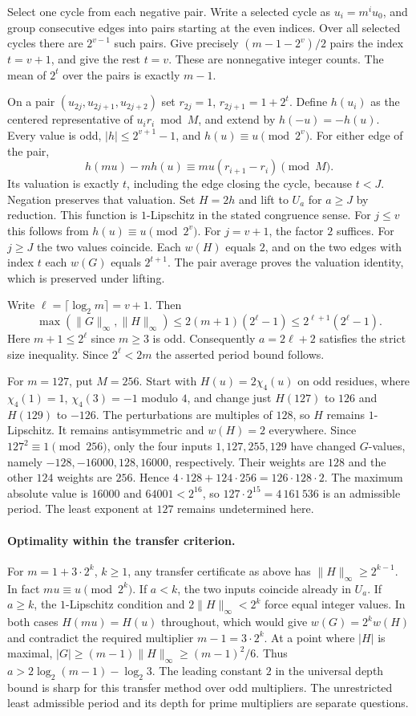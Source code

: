 \documentclass[11pt]{article}
\begin{document}
Select one cycle from each negative pair. Write a selected cycle
as $u_i=m^iu_0$, and group consecutive edges into pairs starting
at the even indices. Over all selected cycles there are $2^{v-1}$
such pairs. Give precisely $(m-1-2^v)/2$ pairs the index $t=v+1$,
and give the rest $t=v$. These are nonnegative integer counts.
The mean of $2^t$ over the pairs is exactly $m-1$.

On a pair $(u_{2j},u_{2j+1},u_{2j+2})$ set
$r_{2j}=1$, $r_{2j+1}=1+2^t$. Define $h(u_i)$ as the centered
representative of $u_i r_i\bmod M$, and extend by $h(-u)=-h(u)$.
Every value is odd, $|h|\le2^{v+1}-1$, and $h(u)\equiv u\pmod{2^v}$.
For either edge of the pair,
\[
 h(mu)-m h(u)\equiv mu(r_{i+1}-r_i)\pmod M.
\]
Its valuation is exactly $t$, including the edge closing the cycle,
because $t<J$. Negation preserves that valuation.
Set $H=2h$ and lift to $U_a$ for $a\ge J$ by reduction. This function is
$1$-Lipschitz in the stated congruence sense. For $j\le v$ this follows
from $h(u)\equiv u\pmod{2^v}$. For $j=v+1$, the factor $2$ suffices.
For $j\ge J$ the two values coincide. Each $w(H)$ equals $2$, and on
the two edges with index $t$ each $w(G)$ equals $2^{t+1}$. The pair
average proves the valuation identity, which is preserved under lifting.

Write $\ell=\lceil\log_2 m\rceil=v+1$. Then
\[
 \max(\|G\|_\infty,\|H\|_\infty)
 \le 2(m+1)(2^\ell-1)
 \le 2^{\ell+1}(2^\ell-1).
\]
Here $m+1\le2^\ell$ since $m\ge3$ is odd.
Consequently $a=2\ell+2$ satisfies the strict size inequality.
Since $2^\ell<2m$ the asserted period bound follows.

For $m=127$, put $M=256$. Start with
$H(u)=2\chi_4(u)$ on odd residues, where $\chi_4(1)=1$,
$\chi_4(3)=-1$ modulo $4$, and change just $H(127)$ to $126$ and
$H(129)$ to $-126$. The perturbations are multiples of $128$, so
$H$ remains $1$-Lipschitz. It remains antisymmetric and $w(H)=2$
everywhere. Since $127^2\equiv1\pmod{256}$, only the four inputs
$1,127,255,129$ have changed $G$-values, namely
$-128,-16000,128,16000$, respectively. Their weights are $128$ and
the other $124$ weights are $256$. Hence
$4\cdot128+124\cdot256=126\cdot128\cdot2$.
The maximum absolute value is $16000$ and $64001<2^{16}$,
so $127\cdot2^{15}=4\,161\,536$ is an admissible period.
The least exponent at $127$ remains undetermined here.

\paragraph{Optimality within the transfer criterion.}
For $m=1+3\cdot2^k$, $k\ge1$, any transfer certificate as above has
$\|H\|_\infty\ge2^{k-1}$. In fact $mu\equiv u\pmod{2^k}$.
If $a<k$, the two inputs coincide already in $U_a$. If $a\ge k$,
the $1$-Lipschitz condition and $2\|H\|_\infty<2^k$ force equal
integer values. In both cases $H(mu)=H(u)$ throughout, which would
give $w(G)=2^k w(H)$ and contradict the required multiplier
$m-1=3\cdot2^k$. At a point where $|H|$ is maximal,
$|G|\ge(m-1)\|H\|_\infty\ge(m-1)^2/6$. Thus
$a>2\log_2(m-1)-\log_2 3$. The leading constant $2$ in the universal
depth bound is sharp for this transfer method over odd multipliers.
The unrestricted least admissible period and its depth for prime
multipliers are separate questions.
\end{document}
